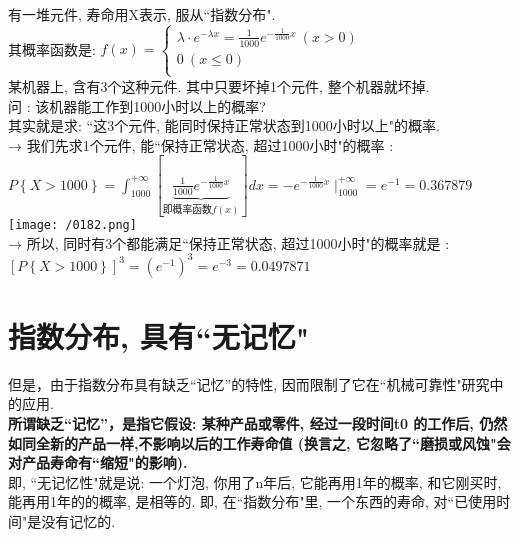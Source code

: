 \documentclass[UTF8]{ctexart}
\begin{document}
\begin{myEnvSample}
	有一堆元件, 寿命用X表示, 服从``指数分布". \\
	其概率函数是: $
	f\left( x \right) =\left\{ \begin{array}{l}
		\lambda \cdot e^{-\lambda x}=\frac{1}{1000}e^{-\frac{1}{1000}x}\ \left( x>0 \right)\\
		0\ \left( x\leq 0 \right)\\
	\end{array} \right. 
	$ \\
	
	某机器上, 含有3个这种元件. 其中只要坏掉1个元件, 整个机器就坏掉. \\
	问 : 该机器能工作到1000小时以上的概率? \\
	
	其实就是求: ``这3个元件, 能同时保持正常状态到1000小时以上"的概率. \\
	
	→ 我们先求1个元件, 能``保持正常状态, 超过1000小时"的概率 : \\
	$
	P\left\{ X>1000 \right\} =\int_{1000}^{+\infty}{\left[ \underset{\text{即概率函数}f(x)}{\underbrace{\frac{1}{1000}e^{-\frac{1}{1000}x}}} \right]}dx=-e^{-\frac{1}{1000}x}\mid_{1000}^{+\infty}=e^{-1}=0.367879
	$ \\
	
	\texttt{[image: /0182.png]} \\
	
	→ 所以, 同时有3个都能满足``保持正常状态, 超过1000小时"的概率就是 : \\
	$
	\left[ P\left\{ X>1000 \right\} \right] ^3=(e^{-1})^3=e^{-3}=0.0497871
	$ \\
	
	
	
\end{myEnvSample}






\section{指数分布, 具有``无记忆" }

但是，由于指数分布具有缺乏“记忆”的特性, 因而限制了它在``机械可靠性"研究中的应用. \\

\textbf{所谓缺乏``记忆”，是指它假设: 某种产品或零件, 经过一段时间t0 的工作后, 仍然如同全新的产品一样,不影响以后的工作寿命值 (换言之, 它忽略了``磨损或风蚀"会对产品寿命有``缩短"的影响).} \\
即, ``无记忆性"就是说:  一个灯泡, 你用了n年后, 它能再用1年的概率, 和它刚买时, 能再用1年的的概率, 是相等的.  即, 在``指数分布"里, 一个东西的寿命, 对``已使用时间"是没有记忆的. \\
\end{document}
